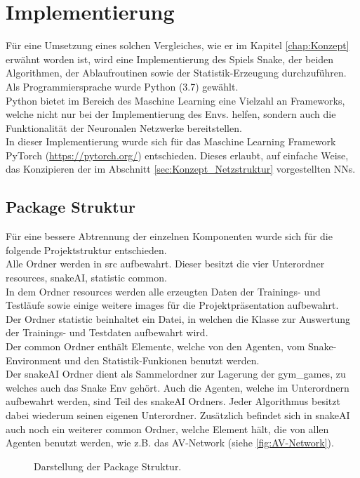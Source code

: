\chapter{Implementierung} \label{chap:Implementierung}
\graphicspath{{Abbildungen/Implementierung/}}
Für eine Umsetzung eines solchen Vergleiches, wie er im Kapitel \ref{chap:Konzept} erwähnt worden ist, wird eine Implementierung des Spiels Snake, der beiden Algorithmen, der Ablaufroutinen sowie der Statistik-Erzeugung durchzuführen. Als Programmiersprache wurde Python (3.7) gewählt.\\
Python bietet im Bereich des Maschine Learning eine Vielzahl an Frameworks, welche nicht nur bei der Implementierung des Envs. helfen, sondern auch die Funktionalität der Neuronalen Netzwerke bereitstellen.\\
In dieser Implementierung wurde sich für das Maschine Learning Framework PyTorch (\url{https://pytorch.org/}) entschieden. Dieses erlaubt, auf einfache Weise, das Konzipieren der im Abschnitt \ref{sec:Konzept_Netzstruktur} vorgestellten NNs.

\section{Package Struktur}
Für eine bessere Abtrennung der einzelnen Komponenten wurde sich für die folgende Projektstruktur entschieden.\\
Alle Ordner werden in src aufbewahrt. Dieser besitzt die vier Unterordner resources, snakeAI, statistic common.\\
In dem Ordner resources werden alle erzeugten Daten der Trainings- und Testläufe sowie einige weitere images für die Projektpräsentation aufbewahrt.\\
Der Ordner statistic beinhaltet ein Datei, in welchen die Klasse zur Auswertung der Trainings- und Testdaten aufbewahrt wird.\\
Der common Ordner enthält Elemente, welche von den Agenten, vom Snake-Environment und den Statistik-Funkionen benutzt werden.\\
Der snakeAI Ordner dient als Sammelordner zur Lagerung der gym\_games, zu welches auch das Snake Env gehört. Auch die Agenten, welche im Unterordnern aufbewahrt werden, sind Teil des snakeAI Ordners. Jeder Algorithmus besitzt dabei wiederum seinen eigenen Unterordner. Zusätzlich befindet sich in snakeAI auch noch ein weiterer common Ordner, welche Element hält, die von allen Agenten benutzt werden, wie z.B. das AV-Network (siehe \ref{fig:AV-Network}).
\begin{figure}[H]
	\centering
	\def\svgscale{0.1}
	
	\caption[Package Struktur]{Darstellung der Package Struktur.}
	\label{fig:Package_Struktur}
\end{figure}

